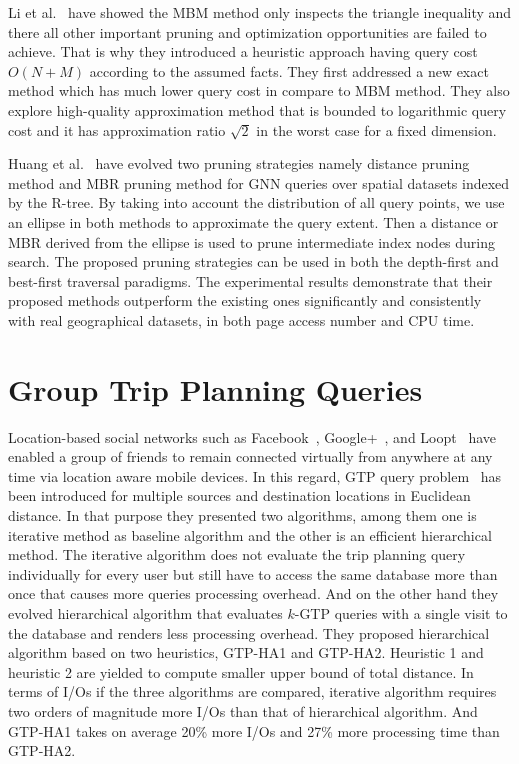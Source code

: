 Li et al.~\cite{geq:p} have showed the MBM method only inspects the triangle inequality and there all other important pruning and optimization opportunities are failed to achieve. That is why they introduced a heuristic approach having query cost $O(N+M)$ according to the assumed facts. They first addressed a new exact method which has much lower query cost in compare to MBM method. They also explore high-quality approximation method that is bounded to logarithmic query cost and it has approximation ratio $\sqrt{2}$ in the worst case for a fixed dimension.

Huang et al.~\cite{pgnn:s} have evolved two pruning strategies namely distance pruning method and MBR pruning method for GNN queries over spatial datasets indexed by the R-tree. By taking into account the distribution of all query points, we use an ellipse in both methods to approximate the query extent. Then a distance or MBR derived from the ellipse is used to prune intermediate index nodes during search. The proposed pruning strategies can be used in both the depth-first and best-first traversal paradigms. The experimental results demonstrate that their proposed methods outperform the existing ones significantly and consistently with real geographical datasets, in both page access number and CPU time.





\section{\label{sec:GTPQ}Group Trip Planning Queries}
Location-based social networks such as Facebook~\cite{facebook}, Google+~\cite{google}, and Loopt~\cite{loopt} have enabled a group of friends to remain connected virtually from anywhere at any time via location aware mobile devices. In this regard, GTP query problem~\cite{Tanzima:Ali} has been introduced for multiple sources and destination locations in Euclidean distance. In that purpose they presented two algorithms, among them one is iterative method as baseline algorithm and the other is an efficient hierarchical method. The iterative algorithm does not evaluate the trip planning query individually for every user but still have to access the same database more than once that causes more queries processing overhead. And on the other hand they evolved hierarchical algorithm that evaluates $k$-GTP queries with a single visit to the database and renders less processing overhead. They proposed hierarchical algorithm based on two heuristics, GTP-HA1 and GTP-HA2. Heuristic 1 and heuristic 2 are yielded to compute smaller upper bound of total distance. In terms of I/Os if the three algorithms are compared, iterative algorithm requires two orders of magnitude more I/Os than that of hierarchical algorithm. And GTP-HA1 takes on average 20\% more I/Os and 27\% more processing time than GTP-HA2.


